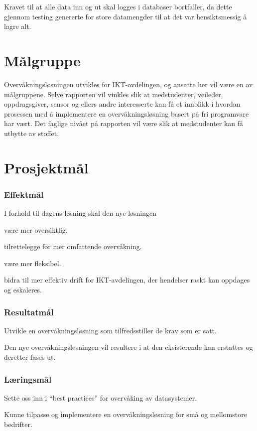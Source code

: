Kravet til at alle data inn og ut skal logges i databaser bortfaller, da dette gjennom testing genererte for store datamengder til at det var hensiktsmessig å lagre alt.

\section{Målgruppe}
Overvåkningsløsningen utvikles for IKT-avdelingen, og ansatte her vil være en av målgruppene. Selve rapporten vil vinkles slik at medstudenter, veileder, oppdragsgiver, sensor og ellers andre interesserte kan få et innblikk i hvordan prosessen med å implementere en overvåkningsløsning basert på fri programvare har vært. Det faglige nivået på rapporten vil være slik at medstudenter kan få utbytte av stoffet.

\section{Prosjektmål}
\subsubsection{Effektmål}
I forhold til dagens løsning skal den nye løsningen
\begin{itemize*}
	\item være mer oversiktlig.
	\item tilrettelegge for mer omfattende overvåkning.
	\item være mer fleksibel.
	\item bidra til mer effektiv drift for IKT-avdelingen, der hendelser raskt kan oppdages og eskaleres.
\end{itemize*}

\subsubsection{Resultatmål}
\begin{itemize*}
	\item Utvikle en overvåkningsløsning som tilfredsstiller de krav som er satt.
	\item Den nye overvåkningsløsningen vil resultere i at den eksisterende kan erstattes og deretter fases ut.
\end{itemize*}

\subsubsection{Læringsmål}
\begin{itemize*}
	\item Sette oss inn i ``best practices'' for overvåking av datasystemer.
	\item Kunne tilpasse og implementere en overvåkningsløsning for små og mellomstore bedrifter.
\end{itemize*}

